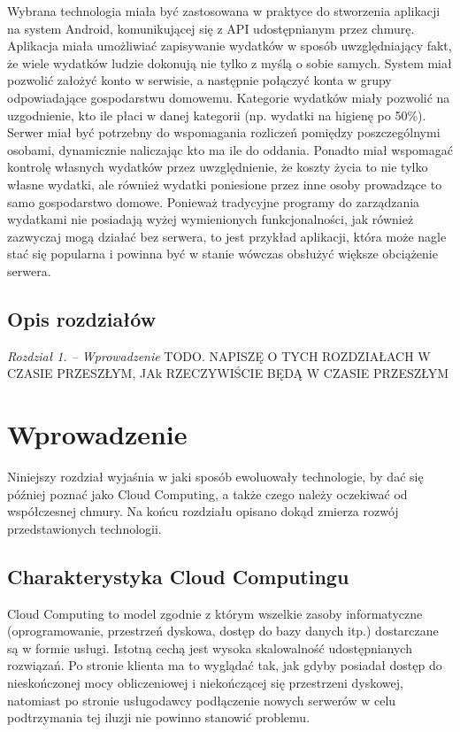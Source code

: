 \documentclass[12pt,a4paper,twoside,titlepage,openright]{book}
\begin{document}
Wybrana technologia miała być zastosowana w praktyce do stworzenia aplikacji na system Android, komunikującej się z API udostępnianym przez chmurę. Aplikacja miała umożliwiać zapisywanie wydatków w sposób uwzględniający fakt, że wiele wydatków ludzie dokonują nie tylko z myślą o sobie samych. System miał pozwolić założyć konto w serwisie, a następnie połączyć konta w grupy odpowiadające gospodarstwu domowemu. Kategorie wydatków miały pozwolić na uzgodnienie, kto ile płaci w danej kategorii (np. wydatki na higienę po 50\%). Serwer miał być potrzebny do wspomagania rozliczeń pomiędzy poszczególnymi osobami, dynamicznie naliczając kto ma ile do oddania. Ponadto miał wspomagać kontrolę własnych wydatków przez uwzględnienie, że koszty życia to nie tylko własne wydatki, ale również wydatki poniesione przez inne osoby prowadzące to samo gospodarstwo domowe. Ponieważ tradycyjne programy do zarządzania wydatkami nie posiadają wyżej wymienionych funkcjonalności, jak również zazwyczaj mogą działać bez serwera, to jest przykład aplikacji, która może nagle stać się popularna i powinna być w stanie wówczas obsłużyć większe obciążenie serwera. 



\section*{Opis rozdziałów}
\textit{Rozdział 1. -- Wprowadzenie} TODO. NAPISZĘ O TYCH ROZDZIAŁACH W CZASIE PRZESZŁYM, JAk RZECZYWIŚCIE BĘDĄ W CZASIE PRZESZŁYM


\clearpage{\pagestyle{empty}\cleardoublepage}
\chapter{Wprowadzenie}

Niniejszy rozdział wyjaśnia w jaki sposób ewoluowały technologie, by dać się później poznać jako Cloud Computing, a także czego należy oczekiwać od współczesnej chmury. Na końcu rozdziału opisano dokąd zmierza rozwój przedstawionych technologii.



\section{Charakterystyka Cloud Computingu}

Cloud Computing to model zgodnie z którym wszelkie zasoby informatyczne (oprogramowanie, przestrzeń dyskowa, dostęp do bazy danych itp.) dostarczane są w formie usługi. Istotną cechą jest wysoka skalowalność udostępnianych rozwiązań. Po stronie klienta ma to wyglądać tak, jak gdyby posiadał dostęp do nieskończonej mocy obliczeniowej i niekończącej się przestrzeni dyskowej, natomiast po stronie usługodawcy podłączenie nowych serwerów w celu podtrzymania tej iluzji nie powinno stanowić problemu. \cite{ccBiznes}
\end{document}
